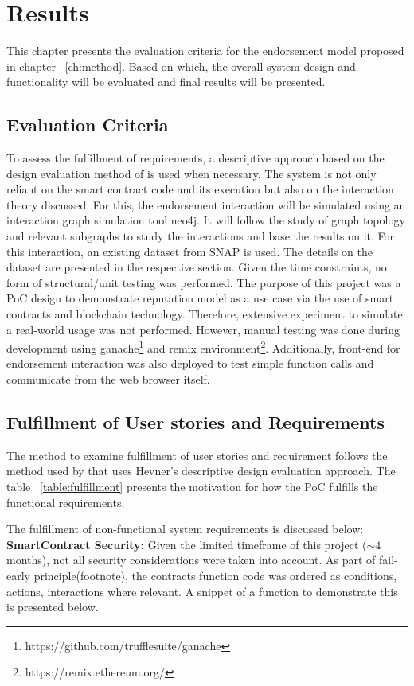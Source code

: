 \chapter{Results} \label{ch:results}
This chapter presents the evaluation criteria for the endorsement model
proposed in chapter ~\ref{ch:method}. Based on which, the overall system design
and functionality will be evaluated and final results will be presented. 

\section{Evaluation Criteria}
To assess the fulfillment of requirements, a descriptive approach
based on the design evaluation method of \cite{hevner2010design} is used when
necessary. The system is not only reliant on the smart contract code and its
execution but also on the interaction theory discussed. For this, the
endorsement interaction will be simulated using an interaction graph simulation
tool neo4j. It will follow the study of graph topology and relevant subgraphs
to study the interactions and base the results on it. For this interaction, an
existing dataset from SNAP\cite{snapnets} is used. The details on the dataset
are presented in the respective section.  Given the time constraints, no form
of structural/unit testing was performed. The purpose of this project was a PoC
design to demonstrate reputation model as a use case via the use of smart
contracts and blockchain technology. Therefore, extensive experiment to
simulate a real-world usage was not performed. However, manual testing was done
during development using
ganache\footnote{https://github.com/trufflesuite/ganache} and remix
environment\footnote{https://remix.ethereum.org/}. Additionally, front-end for
endorsement interaction was also deployed to test simple function calls and
communicate from the web browser itself. 

\section{Fulfillment of User stories and Requirements}
The method to examine fulfillment of user stories and requirement follows the
method used by \cite{Bergquist1107612} that uses Hevner's descriptive design
evaluation approach\cite{hevner2010design}. The table ~\ref{table:fulfillment}
presents the motivation for how the PoC fulfills the functional requirements. 

The fulfillment of non-functional system requirements is discussed below:\\
\textbf{SmartContract Security:} Given the limited timeframe of this project
($\sim{4}$ months), not all security considerations were taken into account. As
part of fail-early principle(footnote), the contracts function code was ordered
as conditions, actions, interactions where relevant. A snippet of a function to
demonstrate this is presented below. 

